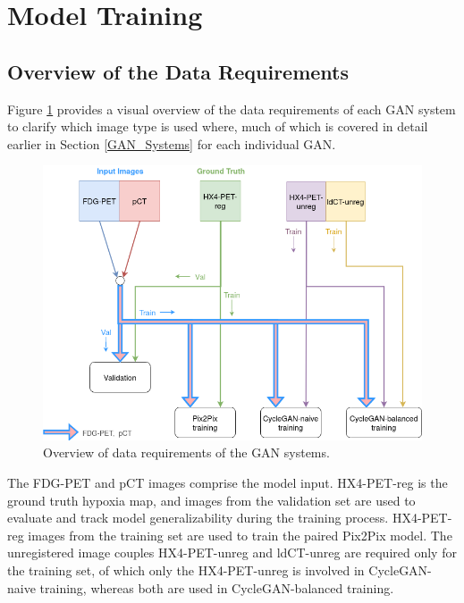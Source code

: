 \section{Model Training}


\subsection{Overview of the Data Requirements}
\label{data_requirements}
Figure \ref{fig:which_images_where} provides a visual overview of the data requirements of each GAN system to clarify which image type is used where, much of which is covered in detail earlier in Section \ref{GAN_Systems} for each individual GAN.

\begin{figure}[h!]
    \centering
    \includegraphics[width=0.8\linewidth]{figures/Data/which_images_where.png}
    \caption{Overview of data requirements of the GAN systems.}
    \label{fig:which_images_where}
\end{figure}

The FDG-PET and pCT images comprise the model input. HX4-PET-reg is the ground truth hypoxia map, and images from the validation set are used to evaluate and track model generalizability during the training process. HX4-PET-reg images from the training set are used to train the paired Pix2Pix model. The unregistered image couples HX4-PET-unreg and ldCT-unreg are required only for the training set, of which only the HX4-PET-unreg is involved in CycleGAN-naive training, whereas both are used in CycleGAN-balanced training.



